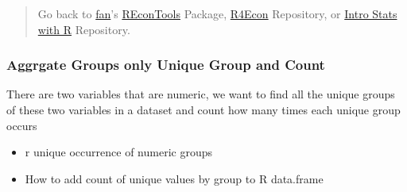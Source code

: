 \documentclass[
]{book}
\providecommand{\tightlist}{%
  \setlength{\itemsep}{0pt}\setlength{\parskip}{0pt}}
\begin{document}
\begin{quote}
Go back to \href{http://fanwangecon.github.io/CodeDynaAsset/}{fan}'s \href{https://fanwangecon.github.io/REconTools/}{REconTools} Package, \href{https://fanwangecon.github.io/R4Econ/}{R4Econ} Repository, or \href{https://fanwangecon.github.io/Stat4Econ/}{Intro Stats with R} Repository.
\end{quote}

\hypertarget{aggrgate-groups-only-unique-group-and-count}{%
\subsubsection{Aggrgate Groups only Unique Group and Count}\label{aggrgate-groups-only-unique-group-and-count}}

There are two variables that are numeric, we want to find all the unique groups of these two variables in a dataset and count how many times each unique group occurs

\begin{itemize}
\tightlist
\item
  r unique occurrence of numeric groups
\item
  How to add count of unique values by group to R data.frame
\end{itemize}
\end{document}
